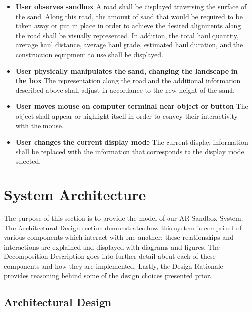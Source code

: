 \documentclass[onecolumn, draftclsnofoot,10pt, compsoc]{IEEEtran}
\begin{document}
\begin{itemize}
\item \textbf{User observes sandbox}
A road shall be displayed traversing the surface of the sand.  Along this road, the amount of sand that would be required to be taken away or put in place in order to achieve the desired alignments along the road shall be visually represented.  In addition, the total haul quantity, average haul distance, average haul grade, estimated haul duration, and the construction equipment to use shall be displayed.

\item \textbf{User physically manipulates the sand, changing the landscape in the box}
The representation along the road and the additional information described above shall adjust in accordance to the new height of the sand.

\item \textbf{User moves mouse on computer terminal near object or button}
The object shall appear or highlight itself in order to convey their interactivity with the mouse.

\item \textbf{User changes the current display mode}
The current display information shall be replaced with the information that corresponds to the display mode selected.
\end{itemize}
\section{System Architecture}
The purpose of this section is to provide the model of our AR Sandbox System.  
The Architectural Design section demonstrates how this system is comprised of various components which interact with one another; these relationships and interactions are explained and displayed with diagrams and figures. 
The Decomposition Description goes into further detail about each of these components and how they are implemented.
Lastly, the Design Rationale provides reasoning behind some of the design choices presented prior.

\subsection{Architectural Design}
\end{document}
